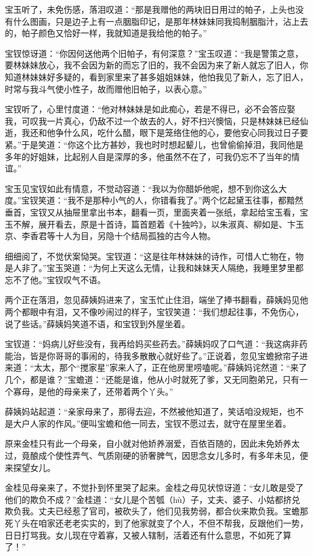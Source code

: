 \documentclass[12pt,oneside]{book}
\begin{document}
宝玉听了，未免伤感，落泪叹道：“那是我赠他的两块旧日用过的帕子，上头也没有什么图画，只是边子上有一点胭脂印记，是那年林妹妹同我捣制胭脂汁，沾上去的，帕子颜色又恰好一样，我就知道是我给他的帕子。”

宝钗惊讶道：“你因何送他两个旧帕子，有何深意？”宝玉叹道：“我是警策之意，要林妹妹放心，我不会因为新的而忘了旧的，我不会因为来了新人就忘了旧人，你知道林妹妹好多疑的，看到家里来了甚多姐姐妹妹，他怕我见了新人，忘了旧人，时常与我斗气使小性子，故而赠他旧帕子，以表心意。”

宝钗听了，心里忖度道：“他对林妹妹是如此痴心，若是不得已，必不会答应娶我，可叹我一片真心，仍敌不过一个故去的人，好不扫兴懊恼，只是林妹妹已经仙逝，我还和他争什么风，吃什么醋，眼下是笼络住他的心，要他安心同我过日子要紧。”于是笑道：“你这个比方甚妙，我也时时想起颦儿，也曾偷偷掉泪，我同他是多年的好姐妹，比起别人自是深厚的多，他虽然不在了，可我仍忘不了当年的情谊。”

宝玉见宝钗如此有情意，不觉动容道：“我以为你醋妒他呢，想不到你这么大度。”宝钗笑道：“我不是那种小气的人，你错看我了。”两个忆起黛玉往事，都黯然垂首，宝钗又从抽屉里拿出书本，翻看一页，里面夹着一张纸，拿起给宝玉看，宝玉不解，展开看去，原是十首诗，篇首题着《十独吟》，以朱淑真、柳如是、卞玉京、李香君等十人为目，另隐十个结局孤独的古今人物。

细细阅了，不觉伏案恸哭。宝钗道：“这是往年林妹妹的诗作，可惜人亡物在，物是人非了。”宝玉哭道：“为何上天这么无情，让我和妹妹天人隔绝，我睡里梦里都忘不了他。”宝钗叹气不语。

两个正在落泪，忽见薛姨妈进来了，宝玉忙止住泪，端坐了捧书翻看，薛姨妈见他两个都眼中有泪，又不像吵闹过的样子，宝钗笑道：“我们想起往事，不免伤心，说了些话。”薛姨妈笑道不语，和宝钗到外屋坐着。

宝钗道：“妈病儿好些没有，我再给妈买些药去。”薛姨妈叹了口气道：“我这病非药能治，皆是你哥哥的事闹的，待我多散散心就好些了。”正说着，忽见宝蟾掀帘子进来道：“太太，那个“搅家星”家来人了，正在他房里唠嗑呢。”薛姨妈诧然道：“来了几个，都是谁？”宝蟾道：“还能是谁，他从小时就死了爹，又无同胞弟兄，只有一个寡母，是他的母亲来了，还带着两个丫头。”

薛姨妈站起道：“亲家母来了，那得去迎，不然被他知道了，笑话咱没规矩，也不是大户人家的作风。”便叫宝蟾和他一同去，宝钗不愿过去，就守在屋里坐着。

原来金桂只有此一个母亲，自小就对他娇养溺爱，百依百随的，因此未免娇养太过，竟酿成个使性弄气、气质刚硬的骄奢脾气，因思念女儿多时，有多年未见，便来探望女儿。

金桂见母亲来了，不觉扑到怀里哭了起来。金桂之母见状惊讶道：“女儿敢是受了他们的欺负不成？”金桂道：“女儿是个苦瓠（hù）子，丈夫、婆子、小姑都挤兑欺负我。丈夫已经惹了官司，被砍头了，他们见我势弱，都合伙来欺负我。宝蟾那死丫头在咱家还老老实实的，到了他家就变了个人，不但不帮我，反跟他们一势，日日打骂我。女儿现在守着寡，又被人辖制，活着还有什么意思，不如死了算了！”
\end{document}
